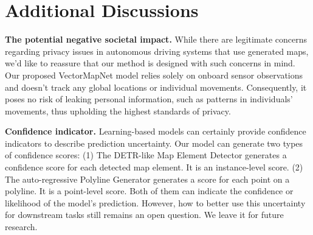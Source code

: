 \documentclass{article}
\theoremstyle{plain}
\theoremstyle{definition}
\theoremstyle{remark}
\begin{document}
\begin{table}[!ht]
    \centering
\caption{VectorMapNet performance under different extrinsic noise.}
    \label{tab:robustness}
\end{table} 
\section{Additional Discussions}
\label{sec:Discussions}

\noindent\textbf{The potential negative societal impact.} While there are legitimate concerns regarding privacy issues in autonomous driving systems that use generated maps, we'd like to reassure that our method is designed with such concerns in mind. Our proposed VectorMapNet model relies solely on onboard sensor observations and doesn't track any global locations or individual movements. Consequently, it poses no risk of leaking personal information, such as patterns in individuals' movements, thus upholding the highest standards of privacy.

\noindent\textbf{Confidence indicator.} Learning-based models can certainly provide confidence indicators to describe prediction uncertainty. Our model can generate two types of confidence scores: (1) The DETR-like Map Element Detector generates a confidence score for each detected map element. It is an instance-level score. (2) The auto-regressive Polyline Generator generates a score for each point on a polyline. It is a point-level score. Both of them can indicate the confidence or likelihood of the model's prediction. However, how to better use this uncertainty for downstream tasks still remains an open question. We leave it for future research.
\end{document}
